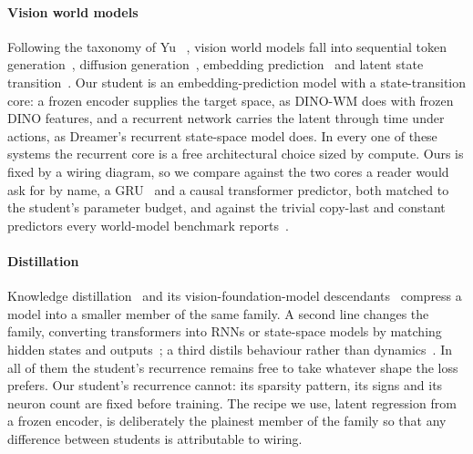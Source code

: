 \paragraph{Vision world models}
Following the taxonomy of Yu \etal~\cite{yu2026seeing}, vision world models fall into sequential token
generation~\cite{bruce2024genie}, diffusion generation~\cite{agarwal2025cosmos,bar2024nwm}, embedding
prediction~\cite{lecun2022path,bardes2024vjepa,assran2025vjepa2,vjepa21_2026,zhou2024dinowm,baldassarre2025dinoworld}
and latent state transition~\cite{ha2018world,hafner2023dreamerv3,micheli2023iris,zhang2023storm,robine2023twm}. Our
student is an embedding-prediction model with a state-transition core: a frozen \vjepa encoder supplies the target
space, as DINO-WM does with frozen DINO features, and a recurrent network carries the latent through time under
actions, as Dreamer's recurrent state-space model does. In every one of these systems the recurrent core is a free
architectural choice sized by compute. Ours is fixed by a wiring diagram, so we compare against the two cores a reader
would ask for by name, a GRU~\cite{cho2014learning} and a causal transformer predictor, both matched to the student's
parameter budget, and against the trivial copy-last and constant predictors every world-model benchmark
reports~\cite{bar2024nwm}.

\paragraph{Distillation}
Knowledge distillation~\cite{hinton2015distilling,romero2015fitnets} and its vision-foundation-model
descendants~\cite{oquab2024dinov2,wu2022tinyvit} compress a model into a smaller member of the same family. A second
line changes the family, converting transformers into RNNs or state-space models by matching hidden states and
outputs~\cite{katharopoulos2020linear,kasai2021t2r,bick2024transformers,wang2024mamballama}; a third distils behaviour
rather than dynamics~\cite{rusu2016policy,hafner2020dreamer}. In all of them the student's recurrence remains free to
take whatever shape the loss prefers. Our student's recurrence cannot: its sparsity pattern, its signs and its
neuron count are fixed before training. The recipe we use, latent regression from a frozen encoder, is deliberately
the plainest member of the family so that any difference between students is attributable to wiring.

